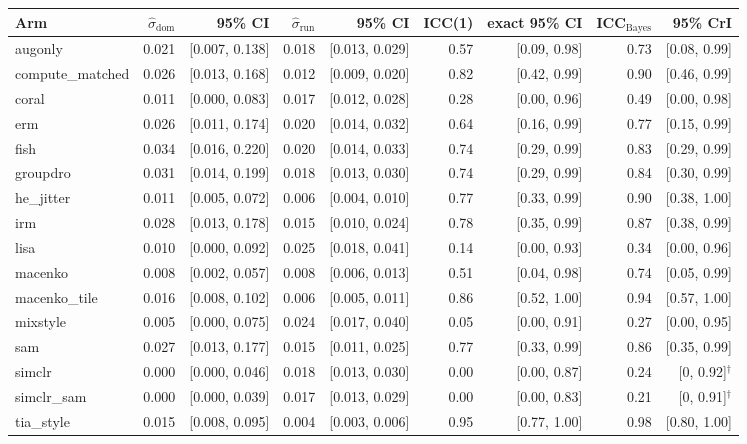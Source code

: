 \begin{tabular}{lrrrrrrrr}
\toprule
Arm & $\hat\sigma_\text{dom}$ & 95\% CI & $\hat\sigma_\text{run}$ & 95\% CI & ICC(1) & exact 95\% CI & ICC$_\text{Bayes}$ & 95\% CrI \\
\midrule
augonly & 0.021 & [0.007, 0.138] & 0.018 & [0.013, 0.029] & 0.57 & [0.09, 0.98] & 0.73 & [0.08, 0.99] \\
compute\_matched & 0.026 & [0.013, 0.168] & 0.012 & [0.009, 0.020] & 0.82 & [0.42, 0.99] & 0.90 & [0.46, 0.99] \\
coral & 0.011 & [0.000, 0.083] & 0.017 & [0.012, 0.028] & 0.28 & [0.00, 0.96] & 0.49 & [0.00, 0.98] \\
erm & 0.026 & [0.011, 0.174] & 0.020 & [0.014, 0.032] & 0.64 & [0.16, 0.99] & 0.77 & [0.15, 0.99] \\
fish & 0.034 & [0.016, 0.220] & 0.020 & [0.014, 0.033] & 0.74 & [0.29, 0.99] & 0.83 & [0.29, 0.99] \\
groupdro & 0.031 & [0.014, 0.199] & 0.018 & [0.013, 0.030] & 0.74 & [0.29, 0.99] & 0.84 & [0.30, 0.99] \\
he\_jitter & 0.011 & [0.005, 0.072] & 0.006 & [0.004, 0.010] & 0.77 & [0.33, 0.99] & 0.90 & [0.38, 1.00] \\
irm & 0.028 & [0.013, 0.178] & 0.015 & [0.010, 0.024] & 0.78 & [0.35, 0.99] & 0.87 & [0.38, 0.99] \\
lisa & 0.010 & [0.000, 0.092] & 0.025 & [0.018, 0.041] & 0.14 & [0.00, 0.93] & 0.34 & [0.00, 0.96] \\
macenko & 0.008 & [0.002, 0.057] & 0.008 & [0.006, 0.013] & 0.51 & [0.04, 0.98] & 0.74 & [0.05, 0.99] \\
macenko\_tile & 0.016 & [0.008, 0.102] & 0.006 & [0.005, 0.011] & 0.86 & [0.52, 1.00] & 0.94 & [0.57, 1.00] \\
mixstyle & 0.005 & [0.000, 0.075] & 0.024 & [0.017, 0.040] & 0.05 & [0.00, 0.91] & 0.27 & [0.00, 0.95] \\
sam & 0.027 & [0.013, 0.177] & 0.015 & [0.011, 0.025] & 0.77 & [0.33, 0.99] & 0.86 & [0.35, 0.99] \\
simclr & 0.000 & [0.000, 0.046] & 0.018 & [0.013, 0.030] & 0.00 & [0.00, 0.87] & 0.24 & [0, 0.92]$^\dagger$ \\
simclr\_sam & 0.000 & [0.000, 0.039] & 0.017 & [0.013, 0.029] & 0.00 & [0.00, 0.83] & 0.21 & [0, 0.91]$^\dagger$ \\
tia\_style & 0.015 & [0.008, 0.095] & 0.004 & [0.003, 0.006] & 0.95 & [0.77, 1.00] & 0.98 & [0.80, 1.00] \\
\bottomrule
\end{tabular}
